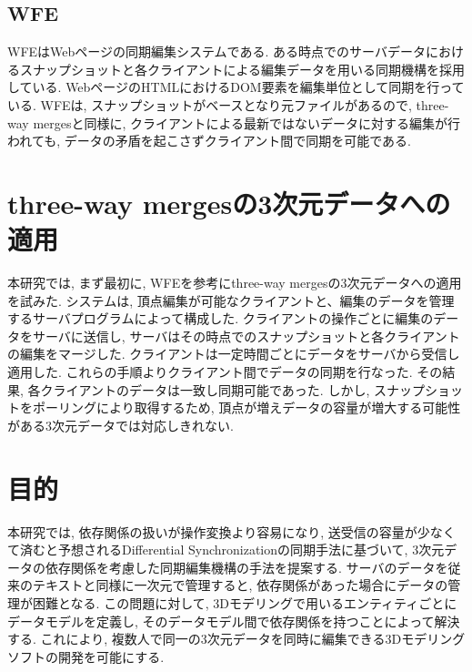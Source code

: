 \subsection{WFE}
WFE\cite{WFE}はWebページの同期編集システムである. ある時点でのサーバデータにおけるスナップショットと各クライアントによる編集データを用いる同期機構を採用している. WebページのHTMLにおけるDOM要素を編集単位として同期を行っている. WFEは, スナップショットがベースとなり元ファイルがあるので, three-way mergesと同様に, クライアントによる最新ではないデータに対する編集が行われても, データの矛盾を起こさずクライアント間で同期を可能である.
\section{three-way mergesの3次元データへの適用}
本研究では, まず最初に, WFEを参考にthree-way mergesの3次元データへの適用を試みた.
システムは, 頂点編集が可能なクライアントと、編集のデータを管理するサーバプログラムによって構成した. クライアントの操作ごとに編集のデータをサーバに送信し, サーバはその時点でのスナップショットと各クライアントの編集をマージした. クライアントは一定時間ごとにデータをサーバから受信し適用した. これらの手順よりクライアント間でデータの同期を行なった. その結果, 各クライアントのデータは一致し同期可能であった. しかし, スナップショットをポーリングにより取得するため, 頂点が増えデータの容量が増大する可能性がある3次元データでは対応しきれない.
\section{目的}
本研究では, 依存関係の扱いが操作変換より容易になり, 送受信の容量が少なくて済むと予想されるDifferential Synchronizationの同期手法に基づいて, 3次元データの依存関係を考慮した同期編集機構の手法を提案する.
サーバのデータを従来のテキストと同様に一次元で管理すると, 依存関係があった場合にデータの管理が困難となる. この問題に対して, 3Dモデリングで用いるエンティティごとにデータモデルを定義し, そのデータモデル間で依存関係を持つことによって解決する. これにより, 複数人で同一の3次元データを同時に編集できる3Dモデリングソフトの開発を可能にする.
